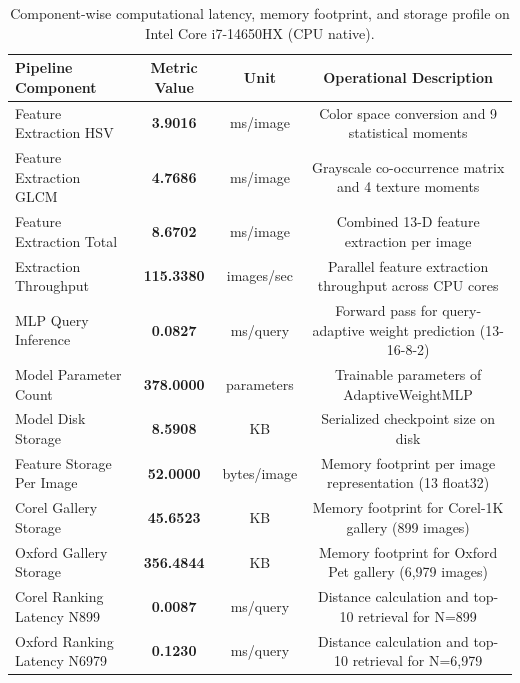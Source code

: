 \begin{table}[!t]
\centering
\caption{Component-wise computational latency, memory footprint, and storage profile on Intel Core i7-14650HX (CPU native).}
\label{tab:computational_runtime}
\begin{tabular}{lccc}
\toprule
\textbf{Pipeline Component} & \textbf{Metric Value} & \textbf{Unit} & \textbf{Operational Description} \\
\midrule
Feature Extraction HSV & \textbf{3.9016} & ms/image & Color space conversion and 9 statistical moments \\
Feature Extraction GLCM & \textbf{4.7686} & ms/image & Grayscale co-occurrence matrix and 4 texture moments \\
Feature Extraction Total & \textbf{8.6702} & ms/image & Combined 13-D feature extraction per image \\
Extraction Throughput & \textbf{115.3380} & images/sec & Parallel feature extraction throughput across CPU cores \\
MLP Query Inference & \textbf{0.0827} & ms/query & Forward pass for query-adaptive weight prediction (13-16-8-2) \\
Model Parameter Count & \textbf{378.0000} & parameters & Trainable parameters of AdaptiveWeightMLP \\
Model Disk Storage & \textbf{8.5908} & KB & Serialized checkpoint size on disk \\
Feature Storage Per Image & \textbf{52.0000} & bytes/image & Memory footprint per image representation (13 float32) \\
Corel Gallery Storage & \textbf{45.6523} & KB & Memory footprint for Corel-1K gallery (899 images) \\
Oxford Gallery Storage & \textbf{356.4844} & KB & Memory footprint for Oxford Pet gallery (6,979 images) \\
Corel Ranking Latency N899 & \textbf{0.0087} & ms/query & Distance calculation and top-10 retrieval for N=899 \\
Oxford Ranking Latency N6979 & \textbf{0.1230} & ms/query & Distance calculation and top-10 retrieval for N=6,979 \\
\bottomrule
\end{tabular}
\end{table}